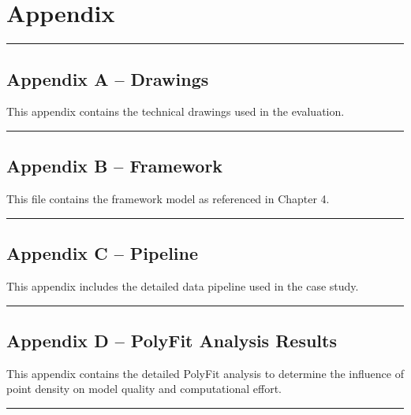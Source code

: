 \chapter*{Appendix}
\label{sec:appendix}

\noindent\rule{\linewidth}{0.4pt}

\section*{Appendix A -- Drawings}
This appendix contains the technical drawings used in the evaluation.\\

\noindent\rule{\linewidth}{0.4pt}

\section*{Appendix B -- Framework}
This file contains the framework model as referenced in Chapter 4.\\

\noindent\rule{\linewidth}{0.4pt}

\section*{Appendix C -- Pipeline}
This appendix includes the detailed data pipeline used in the case study.\\
\label{app:pipeline}

\noindent\rule{\linewidth}{0.4pt}

\section*{Appendix D -- PolyFit Analysis Results}
This appendix contains the detailed PolyFit analysis to determine the influence of point density on model quality and computational effort.\\
\label{app:polyfit}

\noindent\rule{\linewidth}{0.4pt}
